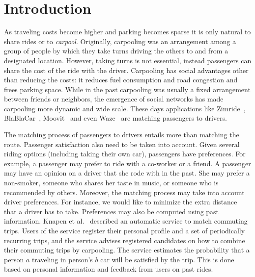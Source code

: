 \section{Introduction}

As traveling costs become higher and parking becomes sparse it is only
natural to share rides or to \emph{carpool}.  Originally, carpooling
was an arrangement among a group of people by which they take turns
driving the others to and from a designated location.  However, taking
turns is not essential, instead passengers can share the cost of the
ride with the driver.  Carpooling has social advantages other than
reducing the costs: it reduces fuel consumption and road congestion
and frees parking space.  
%
While in the past carpooling was usually a fixed arrangement between
friends or neighbors, the emergence of social networks has made
carpooling more dynamic and wide scale.  These days applications like
Zimride~\cite{zimride}, BlaBlaCar~\cite{blablacar},
Moovit~\cite{moovit} and even Waze~\cite{waze} are matching passengers
to drivers.

The matching process of passengers to drivers entails more than
matching the route.
%
Passenger satisfaction also need to be taken into account.  Given
several riding options (including taking their own car), passengers
have preferences.  For example, a passenger may prefer to ride with a
co-worker or a friend.  A passenger may have an opinion on a driver
that she rode with in the past.  She may prefer a non-smoker, someone
who shares her taste in music, or someone who is recommended by
others.
%
Moreover, the matching process may take into account driver
preferences.  For instance, we would like to minimize the extra
distance that a driver has to take.
%
Preferences may also be computed using past information.  Knapen et
al.~\cite{knapen2013estimating} described an automatic service to
match commuting trips.  Users of the service register their personal
profile and a set of periodically recurring trips, and the service
advises registered candidates on how to combine their commuting trips
by carpooling.  The service estimates the probability that a person
$a$ traveling in person's $b$ car will be satisfied by the trip.  This
is done based on personal information and feedback from users on past
rides.

